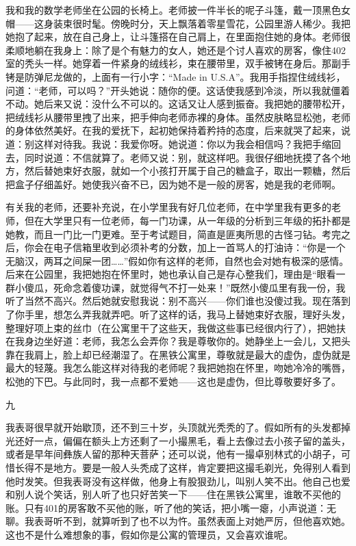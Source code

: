 我和我的数学老师坐在公园的长椅上。老师披一件半长的呢子斗篷，戴一顶黑色女帽——这身装束很时髦。傍晚时分，天上飘落着零星雪花，公园里游人稀少。我把她抱了起来，放在自己身上，让斗篷搭在自己肩上，在里面抱住她的身体。老师很柔顺地躺在我身上：除了是个有魅力的女人，她还是个讨人喜欢的房客，像住402室的秃头一样。她穿着一件紧身的绒线衫，束在腰带里，双手被铐在身后。那副手铐是防弹尼龙做的，上面有一行小字：“Made in U.S.A”。我用手指捏住绒线衫，问道：“老师，可以吗？”开头她说：随你的便。这话使我感到冷淡，所以我就僵着不动。她后来又说：没什么不可以的。这话又让人感到振奋。我把她的腰带松开，把绒线衫从腰带里拽了出来，把手伸向老师赤裸的身体。虽然皮肤略显松弛，老师的身体依然美好。在我的爱抚下，起初她保持着矜持的态度，后来就哭了起来，说道：别这样对待我。我说：我爱你呀。她说道：你以为我会相信吗？我把手缩回去，同时说道：不信就算了。老师又说：别，就这样吧。我很仔细地抚摸了各个地方，然后替她束好衣服，就如一个小孩打开属于自己的糖盒子，取出一颗糖，然后把盒子仔细盖好。她使我兴奋不已，因为她不是一般的房客，她是我的老师啊。 

有关我的老师，还要补充说，在小学里我有好几位老师，在中学里我有更多的老师，但在大学里只有一位老师，每一门功课，从一年级的分析到三年级的拓扑都是她教，而且一门比一门更难。至于考试题目，简直是匪夷所思的古怪刁钻。考完之后，你会在电子信箱里收到必须补考的分数，加上一首骂人的打油诗：“你是一个无脑汉，两耳之间屎一团……”假如你有这样的老师，自然也会对她有极深的感情。后来在公园里，我把她抱在怀里时，她也承认自己是存心整我们，理由是“眼看一群小傻瓜，死命念着傻功课，就觉得气不打一处来！”既然小傻瓜里有我一份，我听了当然不高兴。然后她就安慰我说：别不高兴——你们谁也没傻过我。现在落到了你手里，想怎么弄我就弄吧。听了这样的话，我马上替她束好衣服，理好头发，整理好项上束的丝巾（在公寓里干了这些天，我做这些事已经很内行了），把她扶在我身边坐好道：老师，我怎么会弄你？我是尊敬你的。她静坐上一会儿，又把头靠在我肩上，脸上却已经潮湿了。在黑铁公寓里，尊敬就是最大的虚伪，虚伪就是最大的轻蔑。我怎么能这样对待我的老师呢？我把她抱在怀里，吻她冷冷的嘴唇，松弛的下巴。与此同时，我一点都不爱她——这也是虚伪，但比尊敬要好多了。 



九 

我表哥很早就开始歇顶，还不到三十岁，头顶就光秃秃的了。假如所有的头发都掉光还好一点，偏偏在额头上方还剩了一小撮黑毛，看上去像过去小孩子留的盖头，或者是早年间彝族人留的那种天菩萨；还可以说，他有一撮卓别林式的小胡子，可惜长得不是地方。要是一般人头秃成了这样，肯定要把这撮毛剃光，免得别人看到他时发笑。但我表哥没有这样做，他身上有股狠劲儿，叫别人笑不出。他自己也爱和别人说个笑话，别人听了也只好苦笑一下——住在黑铁公寓里，谁敢不买他的账。只有401的房客敢不买他的账，听了他的笑话，把小嘴一瘪，小声说道：无聊。我表哥听不到，就算听到了也不以为忤。虽然表面上对她严厉，但他喜欢她。这也不是什么难想象的事，假如你是公寓的管理员，又会喜欢谁呢。 

